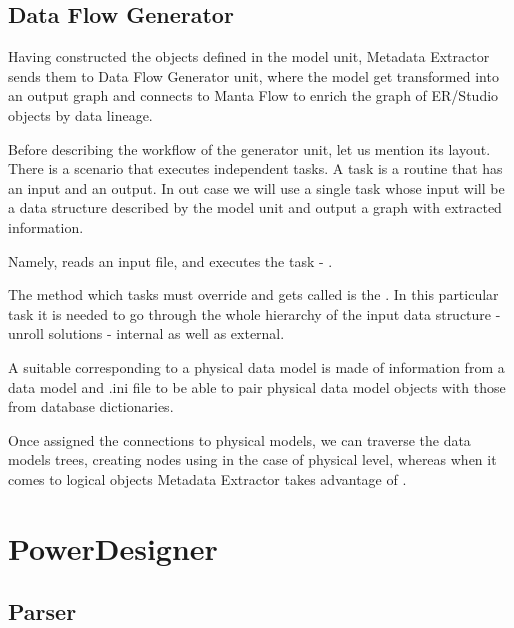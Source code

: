\subsection{Data Flow Generator}

Having constructed the objects defined in the model unit, Metadata Extractor sends them to Data Flow Generator unit, where the model get transformed into an output graph and connects to Manta Flow to enrich the graph of ER/Studio objects by data lineage.

Before describing the workflow of the generator unit, let us mention its layout.
There is a scenario that executes independent tasks. A task is a routine that has an input and an output. In out case we will use a single task whose input will be a data structure described by the model unit and output a graph with extracted information.

 Namely,  reads an input file, and executes the task - . 
 
 The method which tasks must override and gets called is the . In this particular task it is needed to go through the whole hierarchy of the input data structure -  unroll solutions - internal as well as external.

A suitable  corresponding to a physical data model is made of information from a data model and .ini file to be able to pair physical data model objects with those from database dictionaries.

Once assigned the connections to physical models, we can traverse the data models trees, creating nodes using  in the case of physical level, whereas when it comes to logical objects Metadata Extractor takes advantage of .



\section{PowerDesigner}

\subsection{Parser}

